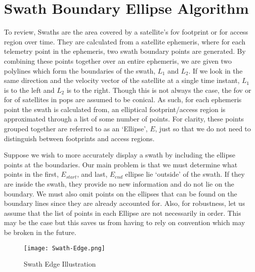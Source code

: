 


\section{Swath Boundary Ellipse Algorithm} \label{alg:ellipse}

To review, Swaths are the area covered by a satellite's \gls{fov} footprint or
\gls{for} access region over time. They are calculated from a satellite
ephemeris, where for each telemetry point in the ephemeris, two swath boundary
points are generated. By combining these points together over an entire
ephemeris, we are given two polylines which form the boundaries of the swath,
$L_1$ and $L_2$. If we look in the same direction and the velocity vector of
the satellite at a single time instant, $L_1$ is to the left and $L_2$ is to
the right. Though this is not always the case, the \gls{fov} or \gls{for} of
satellites in \gls{pops} are assumed to be conical. As such, for each ephemeris
point the swath is calculated from, an elliptical footprint/access region is
approximated through a list of some number of points. For clarity, these points
grouped together are referred to as an `Ellipse', $E$, just so that we do not
need to distinguish between footprints and access regions.  

Suppose we wish to more accurately display a swath by including the ellipse
points at the boundaries. Our main problem is that we must determine what
points in the first, $E_{start}$, and last, $E_{end}$ ellipse lie `outside' of the
swath.  If they are inside the swath, they provide no new information and do
not lie on the boundary.  We must also omit points on the ellipses that can be
found on the boundary lines since they are already accounted for. Also, for
robustness, let us assume that the list of points in each Ellipse are not
necessarily in order. This may be the case but this saves us from having to
rely on convention which may be broken in the future.

\begin{figure}[h]
    \centering
    \texttt{[image: Swath-Edge.png]} 
    \caption{Swath Edge Illustration}
    \label{fig:swath-edge}
\end{figure}


